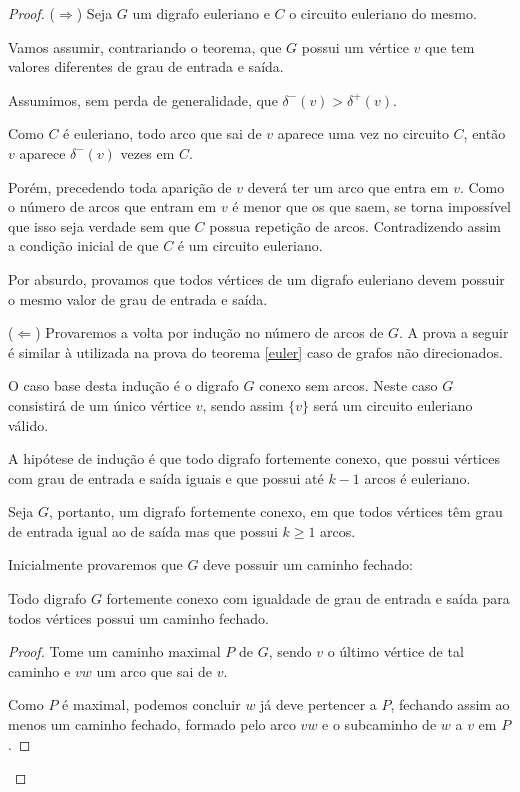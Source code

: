\begin{proof}

    ($\Rightarrow$) Seja $G$ um digrafo euleriano e $C$ o circuito euleriano do mesmo. 

    Vamos assumir, contrariando o teorema, que $G$ possui um vértice $v$ que tem valores diferentes de grau de entrada e saída.

    Assumimos, sem perda de generalidade, que $\delta^-(v) > \delta^+(v)$. 

    Como $C$ é euleriano, todo arco que sai de $v$ aparece uma vez no circuito $C$, então $v$ aparece $\delta^-(v)$ vezes em $C$.

    Porém, precedendo toda aparição de $v$ deverá ter um arco que entra em $v$. 
    Como o número de arcos que entram em $v$ é menor que os que saem, se torna impossível que isso seja verdade sem que $C$ possua repetição de arcos.
    Contradizendo assim a condição inicial de que $C$ é um circuito euleriano.

    Por absurdo, provamos que todos vértices de um digrafo euleriano devem possuir o mesmo valor de grau de entrada e saída.

    ($\Leftarrow$) Provaremos a volta por indução no número de arcos de $G$. 
    A prova a seguir é similar à utilizada na prova do teorema \ref{euler} caso de grafos não direcionados.

    O caso base desta indução é o digrafo $G$ conexo sem arcos. Neste caso $G$ consistirá de um único vértice $v$, sendo assim $\{v\}$ será um circuito euleriano válido. 

    A hipótese de indução é que todo digrafo fortemente conexo, que possui vértices com grau de entrada e saída iguais e que possui até $k-1$ arcos é euleriano.

    Seja $G$, portanto, um digrafo fortemente conexo, em que todos vértices têm grau de entrada igual ao de saída mas que possui $k \geq 1$ arcos.

    Inicialmente provaremos que $G$ deve possuir um caminho fechado:

    \begin{lemma}
        Todo digrafo $G$ fortemente conexo com igualdade de grau de entrada e saída para todos vértices possui um caminho fechado.
    \end{lemma}
    \begin{proof}
        Tome um caminho maximal $P$ de $G$, sendo $v$ o último vértice de tal caminho e $vw$ um arco que sai de $v$.

        Como $P$ é maximal, podemos concluir $w$ já deve pertencer a $P$, fechando assim ao menos um caminho fechado, formado pelo arco $vw$ e o subcaminho de $w$ a $v$ em $P$.
    \end{proof}


\end{proof}
